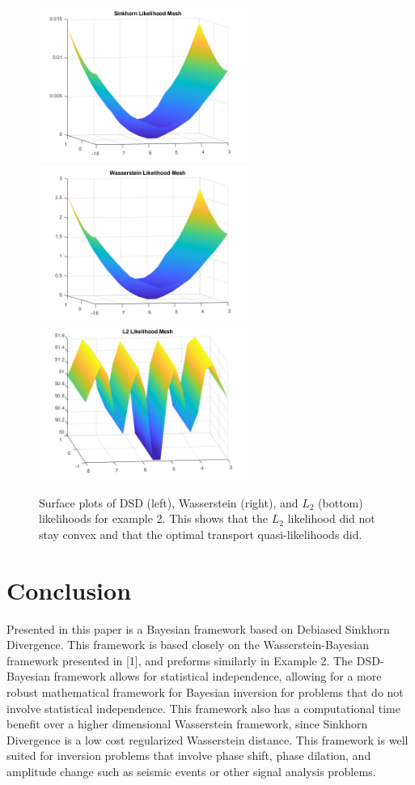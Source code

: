 \documentclass[botnum, fleqn]{unmeethesis}
\begin{document}
\begin{figure}
	\centering
	\includegraphics[width=2.7in,height=2in]{SinkMesh.png}
	\includegraphics[width=2.7in,height=2in]{WassMesh.png}
	\includegraphics[width=2.7in,height=2in]{L2Mesh.png}
	\caption{Surface plots of DSD (left), Wasserstein (right), and $L_2$ (bottom) likelihoods for example 2. This shows that the $L_2$ likelihood did not stay convex and that the optimal transport quasi-likelihoods did.}
\end{figure}

\chapter{Conclusion}
Presented in this paper is a Bayesian framework based on Debiased Sinkhorn Divergence. This framework is based closely on the Wasserstein-Bayesian framework presented in [1], and preforms similarly in Example 2. The DSD-Bayesian framework allows for statistical independence, allowing for a more robust mathematical framework for Bayesian inversion for problems that do not involve statistical independence. This framework also has a computational time benefit over a higher dimensional Wasserstein framework, since Sinkhorn Divergence is a low cost regularized Wasserstein distance. This framework is well suited for inversion problems that involve phase shift, phase dilation, and amplitude change such as seismic events or other signal analysis problems. 
\end{document}
